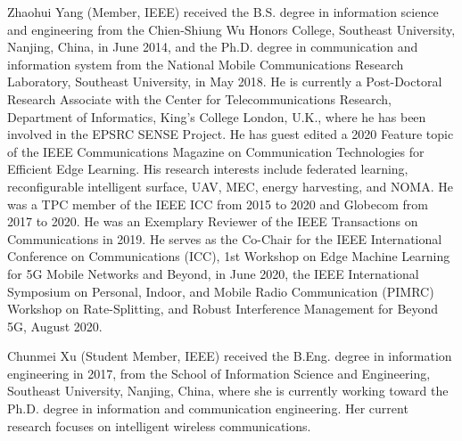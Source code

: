 \documentclass[journal]{IEEEtran}
\begin{document}
\begin{IEEEbiography}
{Zhaohui Yang} (Member, IEEE) received the B.S. degree in information science and engineering from the Chien-Shiung Wu Honors College, Southeast University, Nanjing, China, in June 2014, and the Ph.D. degree in communication and information system from the National Mobile Communications Research Laboratory, Southeast University, in May 2018. He is currently a Post-Doctoral Research Associate with the Center for Telecommunications Research, Department of Informatics, King’s College London, U.K., where he has been involved in the EPSRC SENSE Project. He has guest edited a 2020 Feature topic of the IEEE Communications Magazine on Communication Technologies for Efficient Edge Learning. His research interests include federated learning, reconfigurable intelligent surface, UAV, MEC, energy harvesting, and NOMA. He was a TPC member of the IEEE ICC from 2015 to 2020 and Globecom from 2017 to 2020. He was an Exemplary Reviewer of the IEEE Transactions on Communications in 2019. He serves as the Co-Chair for the IEEE International Conference on Communications (ICC), 1st Workshop on Edge Machine Learning for 5G Mobile Networks and Beyond, in June 2020, the IEEE International Symposium on Personal, Indoor, and Mobile Radio Communication (PIMRC) Workshop on Rate-Splitting, and Robust Interference Management for Beyond 5G, August 2020.
\end{IEEEbiography}
\begin{IEEEbiography}
{Chunmei Xu} (Student Member, IEEE) received the B.Eng. degree in information engineering in 2017, from the School of Information Science and Engineering, Southeast University, Nanjing, China, where she is currently working toward the Ph.D. degree in information and communication engineering. Her current research focuses on intelligent wireless communications.
\end{IEEEbiography}
\end{document}
